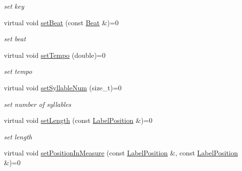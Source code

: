 \begin{DoxyCompactItemize}
\begin{DoxyCompactList}\small\item\em set key \end{DoxyCompactList}\item 
\hypertarget{classsinsy_1_1INoteLabel_a042fc3831e75f82aaa260e6f9ad6c420}{virtual void \hyperlink{classsinsy_1_1INoteLabel_a042fc3831e75f82aaa260e6f9ad6c420}{set\-Beat} (const \hyperlink{classsinsy_1_1Beat}{\-Beat} \&)=0}\label{classsinsy_1_1INoteLabel_a042fc3831e75f82aaa260e6f9ad6c420}

\begin{DoxyCompactList}\small\item\em set beat \end{DoxyCompactList}\item 
\hypertarget{classsinsy_1_1INoteLabel_aa1b79ffb63d27774b83edc04b92ae26b}{virtual void \hyperlink{classsinsy_1_1INoteLabel_aa1b79ffb63d27774b83edc04b92ae26b}{set\-Tempo} (double)=0}\label{classsinsy_1_1INoteLabel_aa1b79ffb63d27774b83edc04b92ae26b}

\begin{DoxyCompactList}\small\item\em set tempo \end{DoxyCompactList}\item 
\hypertarget{classsinsy_1_1INoteLabel_a5bb9bbf4bb64d341860701cec20faae7}{virtual void \hyperlink{classsinsy_1_1INoteLabel_a5bb9bbf4bb64d341860701cec20faae7}{set\-Syllable\-Num} (size\-\_\-t)=0}\label{classsinsy_1_1INoteLabel_a5bb9bbf4bb64d341860701cec20faae7}

\begin{DoxyCompactList}\small\item\em set number of syllables \end{DoxyCompactList}\item 
\hypertarget{classsinsy_1_1INoteLabel_aa58f64fff29825e61f7bb6b8019a84bb}{virtual void \hyperlink{classsinsy_1_1INoteLabel_aa58f64fff29825e61f7bb6b8019a84bb}{set\-Length} (const \hyperlink{classsinsy_1_1LabelPosition}{\-Label\-Position} \&)=0}\label{classsinsy_1_1INoteLabel_aa58f64fff29825e61f7bb6b8019a84bb}

\begin{DoxyCompactList}\small\item\em set length \end{DoxyCompactList}\item 
\hypertarget{classsinsy_1_1INoteLabel_a427c50d1287a56bd349239d17ed92caa}{virtual void \hyperlink{classsinsy_1_1INoteLabel_a427c50d1287a56bd349239d17ed92caa}{set\-Position\-In\-Measure} (const \hyperlink{classsinsy_1_1LabelPosition}{\-Label\-Position} \&, const \hyperlink{classsinsy_1_1LabelPosition}{\-Label\-Position} \&)=0}\label{classsinsy_1_1INoteLabel_a427c50d1287a56bd349239d17ed92caa}


\end{DoxyCompactItemize}
